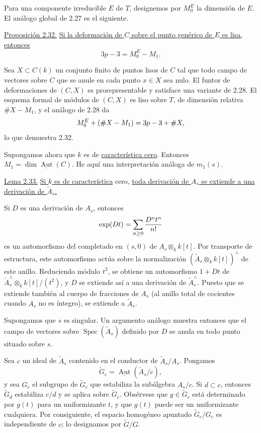Para una componente irreducible $E$ de $T$, designemos por $M_0^E$ la dimensión
de $E$. El análogo global de 2.27 es el siguiente.

\medskip
\noindent\underline{Proposición 2.32.}
\underline{Si la deformación de $C$ sobre el punto genérico de $E$ es lisa,
entonces}
\begin{equation*}
3p-3=M_0^E-M_1.
\end{equation*}

Sea $X\subset C(k)$ un conjunto finito de puntos lisos de $C$ tal que todo campo
de vectores sobre $C$ que se anule en cada punto $x\in X$ sea nulo. El funtor
de deformaciones de $(C,X)$ es prorepresentable y satisface una variante de
2.28. El esquema formal de módulos de $(C,X)$ es liso sobre $T$, de dimensión
relativa $\#X-M_1$, y el análogo de 2.28 da
\begin{equation*}
\sisi{M_0}{M_0^E}+(\#X-M_1)=3p-3+\#X,
\end{equation*}
lo que demuestra 2.32.

Supongamos ahora que $k$ es de \underline{característica cero}. Entonces
$M_1=\dim\underline{\operatorname{Aut}}(C)$. He aquí una interpretación análoga
de $m_1(s)$.

\pageoriginale

\medskip
\noindent\underline{Lema 2.33.}
\underline{Si $k$ es de característica} cero, \underline{toda derivación de $A_s$ se
extiende a una derivación de $\widetilde A_s$.}

Si $D$ es una derivación de $A_s$, entonces
\begin{equation*}
\exp(Dt)=\sisi{\sum}{\sum_{n\geq0}}\frac{D^nt^n}{n!}
\end{equation*}
es un automorfismo del completado en $(s,0)$ de $A_s\otimes_k k[t]$. Por
transporte de estructura, este automorfismo actúa sobre la normalización
$(\widetilde A_s\otimes_k k[t])^{\wedge}$ de este anillo. Reduciendo módulo
$t^2$, se obtiene un automorfismo $1+Dt$ de
$\widetilde A_s^{\wedge}\otimes_k k[t]/(t^2)$, y $D$ se extiende así a una
derivación de $\widetilde A_s^{\wedge}$. Puesto que se extiende también al
cuerpo de fracciones de $A_s$ (al anillo total de cocientes cuando $A_s$ no es
íntegro), se extiende a $\widetilde A_s$.

Supongamos que $s$ es singular. Un argumento análogo muestra entonces que el
campo de vectores sobre $\operatorname{Spec}(\widetilde A_s)$ definido por $D$
se anula en todo punto situado sobre $s$.

Sea $c$ un ideal de $\widetilde A_s$ contenido en el conductor de
$\widetilde A_s/A_s$. Pongamos
\begin{equation*}
\widetilde G_c=\underline{\operatorname{Aut}}(\widetilde A_s/c),
\end{equation*}
y sea $G_c$ el subgrupo de $\widetilde G_c$ que estabiliza la subálgebra
$A_s/c$. Si $d\subset c$, entonces $\widetilde G_d$ estabiliza $c/d$ y se
aplica sobre $\widetilde G_c$. Obsérvese que
$g\in\widetilde G_c$ está determinado por $g(t)$ para un uniformizante $t$, y
que $g(t)$ puede ser un uniformizante cualquiera. Por consiguiente, el espacio
homogéneo apuntado $\widetilde G_c/G_c$ es independiente de $c$; lo designamos
por $\widetilde G/G$.

